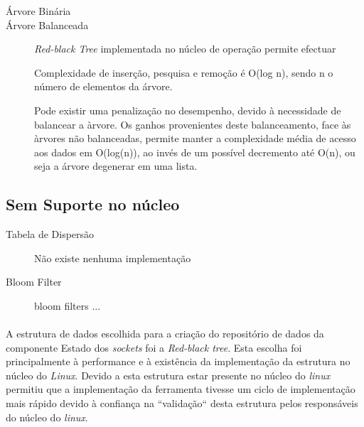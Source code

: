 \begin{description}
\item[Árvore Binária]

\item[Árvore Balanceada]
\textit{Red-black Tree} implementada no núcleo de operação permite efectuar

Complexidade de inserção, pesquisa e remoção é O(log n), sendo n o número de elementos da árvore.

Pode existir uma penalização no desempenho, devido à necessidade de balancear a àrvore.
Os ganhos provenientes deste balanceamento, face às àrvores não balanceadas, permite manter a complexidade média de acesso aos dados em O(log(n)), ao invés de um possível decremento até O(n), ou seja a árvore degenerar em uma lista.
\end{description}

\subsection{Sem Suporte no núcleo}

\begin{description}
\item[Tabela de Dispersão]
Não existe nenhuma implementação 

\item[Bloom Filter]
bloom filters ...

\end{description}
\paragraph*{}
A estrutura de dados escolhida para a criação do repositório de dados da componente Estado dos \textit{sockets} foi a \textit{Red-black tree}.
 Esta escolha foi principalmente à performance e à existência da implementação da estrutura no núcleo do \textit{Linux}.
 Devido a esta estrutura estar presente no núcleo do \textit{linux} permitiu que a implementação da ferramenta tivesse um ciclo de implementação mais rápido devido à confiança na ``validação`` desta estrutura pelos responsáveis do núcleo do \textit{linux}.
 
